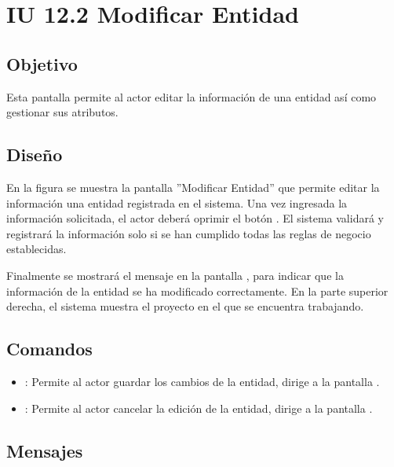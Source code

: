 \section{IU 12.2 Modificar Entidad}

\subsection{Objetivo}
	Esta pantalla permite al actor editar la información de una entidad así como gestionar sus atributos.
\subsection{Diseño}
	En la figura  se muestra la pantalla ''Modificar Entidad'' que permite editar la información una entidad registrada en el sistema.
	Una vez ingresada la información solicitada, el actor deberá oprimir el botón  . El sistema validará y registrará la información solo si se han cumplido todas las reglas de negocio establecidas.
	
	Finalmente se mostrará el mensaje  en la pantalla , para indicar que la información de la entidad se ha modificado correctamente.
	En la parte superior derecha, el sistema muestra el proyecto en el que se encuentra trabajando.

\subsection{Comandos}
\begin{itemize}
	\item {}: Permite al actor guardar los cambios de la entidad, dirige a la pantalla .
	\item {}: Permite al actor cancelar la edición de la entidad, dirige a la pantalla .
\end{itemize}

\subsection{Mensajes}

